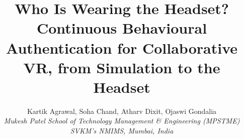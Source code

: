 \documentclass[10pt,twocolumn,letterpaper]{article}
\newcommand\IEEEauthorblockN[1]{{\large #1}\\[2pt]}
\newcommand\IEEEauthorblockA[1]{{\normalsize\itshape #1}}
\begin{document}
\title{Who Is Wearing the Headset? Continuous Behavioural Authentication for Collaborative VR, from Simulation to the Headset}
\author{\IEEEauthorblockN{Kartik Agrawal, Soha Chand, Atharv Dixit, Ojaswi Gondalia}
\IEEEauthorblockA{Mukesh Patel School of Technology Management \& Engineering (MPSTME)\\SVKM's NMIMS, Mumbai, India}}
\date{}
\maketitle

\end{document}
